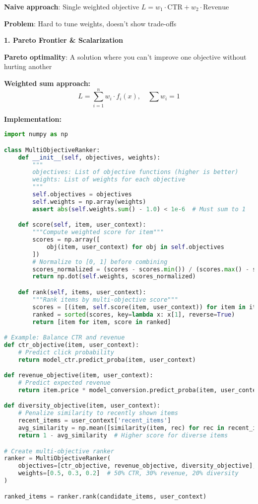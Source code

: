 \documentclass[10pt]{article}
\begin{document}
\textbf{Naive approach}: Single weighted objective $L = w_1 \cdot \text{CTR} + w_2 \cdot \text{Revenue}$

\textbf{Problem}: Hard to tune weights, doesn't show trade-offs

\textbf{1. Pareto Frontier \& Scalarization}

\textbf{Pareto optimality}: A solution where you can't improve one objective without hurting another

\textbf{Weighted sum approach:}
\begin{equation}
L = \sum_{i=1}^{n} w_i \cdot f_i(x), \quad \sum w_i = 1
\end{equation}

\textbf{Implementation:}
\begin{lstlisting}[language=Python]
import numpy as np

class MultiObjectiveRanker:
    def __init__(self, objectives, weights):
        """
        objectives: List of objective functions (higher is better)
        weights: List of weights for each objective
        """
        self.objectives = objectives
        self.weights = np.array(weights)
        assert abs(self.weights.sum() - 1.0) < 1e-6  # Must sum to 1

    def score(self, item, user_context):
        """Compute weighted score for item"""
        scores = np.array([
            obj(item, user_context) for obj in self.objectives
        ])
        # Normalize to [0, 1] before combining
        scores_normalized = (scores - scores.min()) / (scores.max() - scores.min() + 1e-8)
        return np.dot(self.weights, scores_normalized)

    def rank(self, items, user_context):
        """Rank items by multi-objective score"""
        scores = [(item, self.score(item, user_context)) for item in items]
        ranked = sorted(scores, key=lambda x: x[1], reverse=True)
        return [item for item, score in ranked]

# Example: Balance CTR and revenue
def ctr_objective(item, user_context):
    # Predict click probability
    return model_ctr.predict_proba(item, user_context)

def revenue_objective(item, user_context):
    # Predict expected revenue
    return item.price * model_conversion.predict_proba(item, user_context)

def diversity_objective(item, user_context):
    # Penalize similarity to recently shown items
    recent_items = user_context['recent_items']
    avg_similarity = np.mean([similarity(item, rec) for rec in recent_items])
    return 1 - avg_similarity  # Higher score for diverse items

# Create multi-objective ranker
ranker = MultiObjectiveRanker(
    objectives=[ctr_objective, revenue_objective, diversity_objective],
    weights=[0.5, 0.3, 0.2]  # 50% CTR, 30% revenue, 20% diversity
)

ranked_items = ranker.rank(candidate_items, user_context)
\end{lstlisting}
\end{document}

